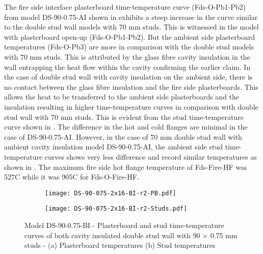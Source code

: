 The fire side interface plasterboard time-temperature curve (Fds-O-Pb1-Pb2) from model DS-90-0.75-AI shown in  exhibits a steep increase in the curve similar to the double stud wall models with 70 mm studs. This is witnessed in the model with plasterboard open-up (Fds-O-Pb1-Pb2). But the ambient side plasterboard temperatures (Fds-O-Pb3) are more in comparison with the double stud models with 70 mm studs. This is attributed by the glass fibre cavity insulation in the wall entrapping the heat flow within the cavity confirming the earlier claim. In the case of double stud wall with cavity insulation on the ambient side, there is no contact between the glass fibre insulation and the fire side plasterboards. This allows the heat to be transferred to the ambient side plasterboards and the insulation resulting in higher time-temperature curves in comparison with double stud wall with 70 mm studs. This is evident from the stud time-temperature curve shown in . The difference in the hot and cold flanges are minimal in the case of DS-90-0.75-AI. However, in the case of 70 mm double stud wall with ambient cavity insulation model DS-90-0.75-AI, the ambient side stud time-temperature curves shows very less difference and record similar temperatures as shown in . The maximum fire side hot flange temperature of Fds-Fire-HF was 527\degree C while it was 905\degree C for Fds-O-Fire-HF. 
\begin{figure}[!htbp]
	\centering
	\begin{subfigure}[b]{0.6\textwidth}
		\centering
		\texttt{[image: DS-90-075-2x16-BI-r2-PB.pdf]}
		\caption{}
		\label{subfig:DS-90-075-2x16-BI-r2-PB}
	\end{subfigure}
	\begin{subfigure}[b]{0.6\textwidth}
		\centering
		\texttt{[image: DS-90-075-2x16-BI-r2-Studs.pdf]}
		\caption{}
		\label{subfig:DS-90-075-2x16-BI-r2-Studs}
	\end{subfigure}
	   \caption{Model DS-90-0.75-BI - Plasterboard and stud time-temperature curves of both cavity insulated double stud wall with 90 $\times$ 0.75 mm studs - (a) Plasterboard temperatures (b) Stud temperatures}
	   \label{fig:DS-90-075-2x16-BI-r2}
\end{figure}

